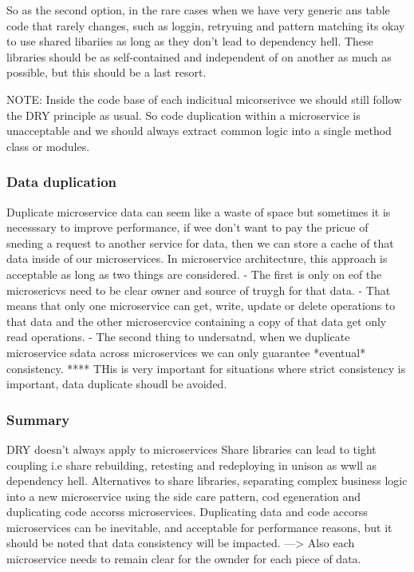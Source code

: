 \documentclass[a4paper, 11pt]{book}
\begin{document}
    So as the second option, in the rare cases when we have very generic ans table code that rarely changes, such as loggin, retryuing and pattern matching its okay to use shared libariies as long as they don't lead to dependency hell.
    These libraries should be as self-contained and independent of on another as much as possible, but this should be a last resort.

    NOTE: Inside the code base of each indicitual micorserivce we should still follow the DRY principle as usual.
    So code duplication within a microservice is unacceptable and we should always extract common logic into a single method class or modules.

    \subsubsection{Data duplication}
    Duplicate microservice data can seem like a waste of space but sometimes it is necesssary to improve performance, if wee don't want to pay the pricue of sneding a request to another service for data, then we can store a cache of that data inside of our microservices.
    In microservice architecture, this approach is acceptable as long as two things are considered.
    - The first is only on eof the microsericvs need to be clear owner and source of truygh for that data.
    - That means that only one microservice can get, write, update or delete operations to that data and the other microsercvice containing a copy of that data get only read operations.
    - The second thing to undersatnd, when we duplicate microservice sdata across microservices we can only guarantee *eventual* consistency.
    **** THis is very important for situations where strict consistency is important, data duplicate shoudl be avoided.

    \subsubsection{Summary}
    DRY doesn't always apply to microservices
    Share libraries can lead to tight coupling i.e share rebuilding, retesting and redeploying in unison as wwll as dependency hell.
    Alternatives to share libraries, separating complex business logic into a new microservice using the side care pattern, cod egeneration and duplicating code accorss microservices.
    Duplicating data and code accorss microservices can be inevitable, and acceptable for performance reasons, but it should be noted that data consistency will be impacted.
    ---> Also each microservice needs to remain clear for the ownder for each piece of data.
\end{document}
